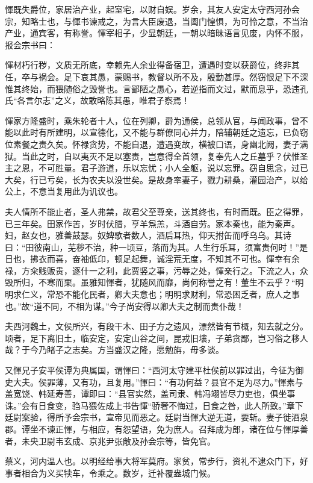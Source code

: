 \documentclass[]{article}
\begin{document}
惲既失爵位，家居治产业，起室宅，以财自娱。岁余，其友人安定太守西河孙会宗，知略士也，与惲书谏戒之，为言大臣废退，当阖门惶惧，为可怜之意，不当治产业，通宾客，有称誉。惲宰相子，少显朝廷，一朝以暗昧语言见废，内怀不服，报会宗书曰：

惲材朽行秽，文质无所底，幸赖先人余业得备宿卫，遭遇时变以获爵位，终非其任，卒与祸会。足下哀其愚，蒙赐书，教督以所不及，殷勤甚厚。然窃恨足下不深惟其终始，而猥随俗之毁誉也。言鄙陋之愚心，若逆指而文过，默而息乎，恐违孔氏``各言尔志''之义，故敢略陈其愚，唯君子察焉！

惲家方隆盛时，乘朱轮者十人，位在列卿，爵为通侯，总领从官，与闻政事，曾不能以此时有所建明，以宣德化，又不能与群僚同心并力，陪辅朝廷之遗忘，已负窃位素餐之责久矣。怀禄贪势，不能自退，遭遇变故，横被口语，身幽北阙，妻子满狱。当此之时，自以夷灭不足以塞责，岂意得全首领，复奉先人之丘墓乎？伏惟圣主之恩，不可胜量。君子游道，乐以忘忧；小人全躯，说以忘罪。窃自思念，过已大矣，行已亏矣，长为农夫以没世矣。是故身率妻子，戮力耕桑，灌园治产，以给公上，不意当复用此为讥议也。

夫人情所不能止者，圣人弗禁，故君父至尊亲，送其终也，有时而既。臣之得罪，已三年矣。田家作苦，岁时伏腊，亨羊炰羔，斗酒自劳。家本秦也，能为秦声。妇，赵女也，雅善鼓瑟。奴婢歌者数人，酒后耳热，仰天拊缶而呼乌乌。其诗曰：``田彼南山，芜秽不治，种一顷豆，落而为其。人生行乐耳，须富贵何时！''是日也，拂衣而喜，奋袖低卬，顿足起舞，诚淫荒无度，不知其不可也。惲幸有余禄，方籴贱贩贵，逐什一之利，此贾竖之事，污辱之处，惲亲行之。下流之人，众毁所归，不寒而栗。虽雅知惲者，犹随风而靡，尚何称誉之有！董生不云乎？``明明求仁义，常恐不能化民者，卿大夫意也；明明求财利，常恐困乏者，庶人之事也。''故``道不同，不相为谋。''今子尚安得以卿大夫之制而责仆哉！

夫西河魏土，文侯所兴，有段干木、田子方之遗风，漂然皆有节概，知去就之分。顷者，足下离旧土，临安定，安定山谷之间，昆戎旧壤，子弟贪鄙，岂习俗之移人哉？于今乃睹子之志矣。方当盛汉之隆，愿勉旃，毋多谈。

又惲兄子安平侯谭为典属国，谓惲曰：``西河太守建平杜侯前以罪过出，今征为御史大夫。侯罪薄，又有功，且复用。''惲曰：``有功何益？县官不足为尽力。''惲素与盖宽饶、韩延寿善，谭即曰：``县官实然，盖司隶、韩冯翊皆尽力吏也，俱坐事诛。''会有日食变，驺马猥佐成上书告惲``骄奢不悔过，日食之咎，此人所致。''章下廷尉案验，得所予会宗书，宣帝见而恶之。廷尉当惲大逆无道，要斩。妻子徙酒泉郡。谭坐不谏正惲，与相应，有怨望语，免为庶人。召拜成为郎，诸在位与惲厚善者，未央卫尉韦玄成、京兆尹张敞及孙会宗等，皆免官。

蔡义，河内温人也。以明经给事大将军莫府。家贫，常步行，资礼不逮众门下，好事者相合为义买犊车，令乘之。数岁，迁补覆盎城门候。
\end{document}
